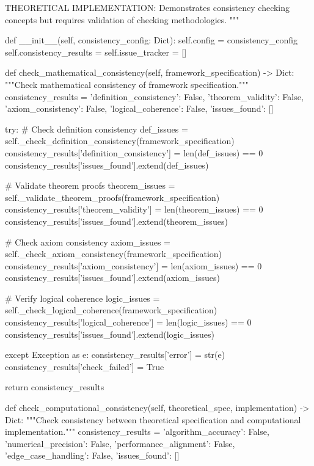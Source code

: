     THEORETICAL IMPLEMENTATION: Demonstrates consistency checking concepts
    but requires validation of checking methodologies.
    """
    
    def __init__(self, consistency_config: Dict):
        self.config = consistency_config
        self.consistency_results = {}
        self.issue_tracker = []
        
    def check_mathematical_consistency(self, framework_specification) -> Dict:
        """Check mathematical consistency of framework specification."""
        consistency_results = {
            'definition_consistency': False,
            'theorem_validity': False,
            'axiom_consistency': False,
            'logical_coherence': False,
            'issues_found': []
        }
        
        try:
            \# Check definition consistency
            def_issues = self._check_definition_consistency(framework_specification)
            consistency_results['definition_consistency'] = len(def_issues) == 0
            consistency_results['issues_found'].extend(def_issues)
            
            \# Validate theorem proofs
            theorem_issues = self._validate_theorem_proofs(framework_specification)
            consistency_results['theorem_validity'] = len(theorem_issues) == 0
            consistency_results['issues_found'].extend(theorem_issues)
            
            \# Check axiom consistency
            axiom_issues = self._check_axiom_consistency(framework_specification)
            consistency_results['axiom_consistency'] = len(axiom_issues) == 0
            consistency_results['issues_found'].extend(axiom_issues)
            
            \# Verify logical coherence
            logic_issues = self._check_logical_coherence(framework_specification)
            consistency_results['logical_coherence'] = len(logic_issues) == 0
            consistency_results['issues_found'].extend(logic_issues)
            
        except Exception as e:
            consistency_results['error'] = str(e)
            consistency_results['check_failed'] = True
            
        return consistency_results
        
    def check_computational_consistency(self, theoretical_spec, implementation) -> Dict:
        """Check consistency between theoretical specification and computational implementation."""
        consistency_results = {
            'algorithm_accuracy': False,
            'numerical_precision': False,
            'performance_alignment': False,
            'edge_case_handling': False,
            'issues_found': []
        }
        
